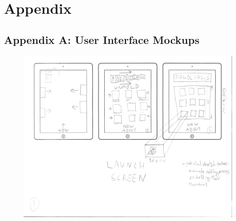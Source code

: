 \chapter{Appendix}

\captionsetup[figure]{list=no}

\section{Appendix A: User Interface
Mockups}\label{appendix-a-user-interface-mockups}

\begin{figure}[htbp]
\centering
\includegraphics{figures/90_Appendix_UI_Mockups/001.png}
\caption{}
\end{figure}

